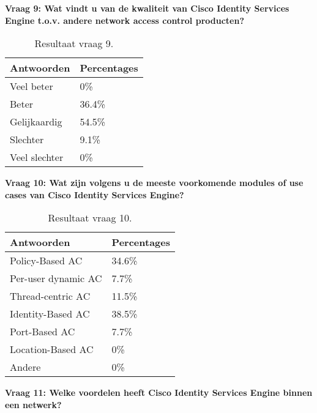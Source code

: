 \textbf{Vraag 9: Wat vindt u van de kwaliteit van Cisco Identity Services Engine t.o.v. andere network access control producten?}
\begin{table}[h!]
	\begin{center}
		\begin{tabular}{|l|l|}
			\hline
			\bf Antwoorden    & \bf Percentages \\ \hline
			Veel beter    & 0\%    \\ \hline
			Beter         & 36.4\% \\ \hline
			Gelijkaardig  & 54.5\% \\ \hline
			Slechter      & 9.1\%  \\ \hline
			Veel slechter & 0\%    \\ \hline                                                                                                                                 
		\end{tabular}
		\caption{Resultaat vraag 9.}
	\end{center}
\end{table}

\newpage
\textbf{Vraag 10: Wat zijn volgens u de meeste voorkomende modules of use cases van Cisco Identity Services Engine?}

\begin{table}[H]
	\begin{center}
		\begin{tabular}{|l|l|}
			\hline
			\bf Antwoorden          & \bf Percentages \\ \hline
			Policy-Based AC     & 34.6\%      \\ \hline
			Per-user dynamic AC & 7.7\%       \\ \hline
			Thread-centric AC   & 11.5\%      \\ \hline
			Identity-Based AC   & 38.5\%      \\ \hline
			Port-Based AC       & 7.7\%       \\ \hline
			Location-Based AC   & 0\%         \\ \hline
			Andere              & 0\%         \\ \hline                                                        
		\end{tabular}
		\caption{Resultaat vraag 10.}
	\end{center}
\end{table}

\textbf{Vraag 11: Welke voordelen heeft Cisco Identity Services Engine binnen een netwerk?}

